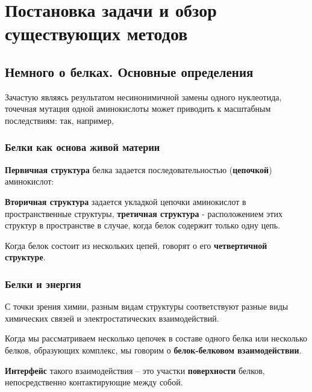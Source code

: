 \graphicspath{{../images/intro/}}
\chapter{Постановка задачи и обзор существующих методов}
\section{Немного о белках. Основные определения}
Зачастую являясь результатом несинонимичной замены одного нуклеотида, точечная мутация одной аминокислоты может приводить к масштабным последствиям: так, например,
\subsection{Белки как основа живой материи}
\textbf{Первичная структура} белка задается последовательностью (\textbf{цепочкой}) аминокислот:


\textbf{Вторичная структура} задается укладкой цепочки аминокислот в пространственные структуры, \textbf{третичная структура} - расположением этих структур в пространстве в случае, когда белок содержит только одну цепь.

Когда белок состоит из нескольких цепей, говорят о его \textbf{четвертичной структуре}.

\subsection{Белки и энергия}
С точки зрения химии, разным видам структуры соответствуют разные виды химических связей и электростатических взаимодействий.

Когда мы рассматриваем несколько цепочек в составе одного белка или несколько белков, образующих комплекс, мы говорим о \textbf{белок-белковом взаимодействии}.

\textbf{Интерфейс} такого взаимодействия -- это участки \textbf{поверхности} белков, непосредственно контактирующие между собой.

